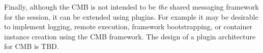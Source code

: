 Finally, although the CMB is not intended to be {\em the} shared messaging
framework for the session, it can be extended using plugins.
For example it may be desirable to implement logging, remote execution,
framework bootstrapping, or container instance creation using the
CMB framework.  The design of a plugin architecture for CMB is TBD.
